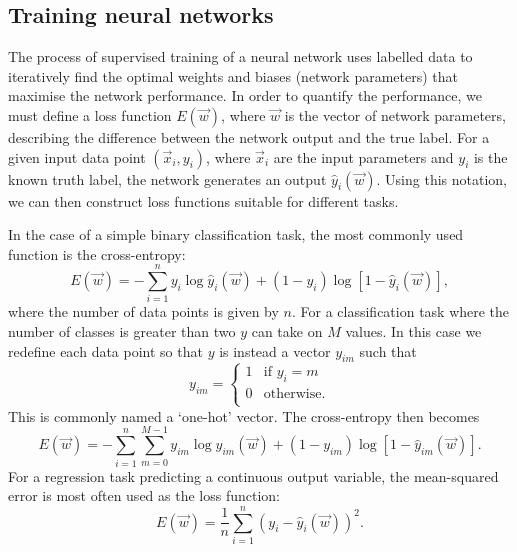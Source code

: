 \subsection{Training neural networks} %
\label{sec:cvn_theory_training} %

The process of supervised training of a neural network uses labelled data to iteratively find the
optimal weights and biases (network parameters) that maximise the network performance. In order to
quantify the performance, we must define a loss function $E(\vec{w})$, where $\vec{w}$ is the
vector of network parameters, describing the difference between the network output and the true
label. For a given input data point $(\vec{x}_{i}, y_{i})$, where $\vec{x}_{i}$ are the input
parameters and $y_{i}$ is the known truth label, the network generates an output
$\hat{y}_{i}(\vec{w})$. Using this notation, we can then construct loss functions suitable for
different tasks.

In the case of a simple binary classification task, the most commonly used function is the
cross-entropy:
\begin{equation} %
    E(\vec{w})=
    -\displaystyle\sum_{i=1}^{n}y_{i}\log\hat{y}_{i}(\vec{w})+
    (1-y_{i})\log[1-\hat{y}_{i}(\vec{w})],
    \label{eq:binary_cross_entropy}
\end{equation}
where the number of data points is given by $n$. For a classification task where the number of
classes is greater than two $y$ can take on $M$ values. In this case we redefine each data point
so that $y$ is instead a vector $y_{im}$ such that
\begin{equation} %
    y_{im}=
    \begin{cases}
        1 & \text{if $y_{i}=m$} \\
        0 & \text{otherwise.}   \\
    \end{cases}
\end{equation}
This is commonly named a `one-hot' vector. The cross-entropy then becomes
\begin{equation} %
    E(\vec{w})=
    -\displaystyle\sum_{i=1}^{n}\displaystyle\sum_{m=0}^{M-1}y_{im}\log\hat{y}_{im}
    (\vec{w})+(1-y_{im})\log[1-\hat{y}_{im}(\vec{w})].
    \label{eq:categorical_cross_entropy}
\end{equation}
For a regression task predicting a continuous output variable, the mean-squared error is most
often used as the loss function:
\begin{equation} %
    E(\vec{w})=
    \frac{1}{n}\displaystyle\sum_{i=1}^{n}(y_{i}-
    \hat{y}_{i}(\vec{w}))^{2}.
    \label{eq:mse}
\end{equation}

